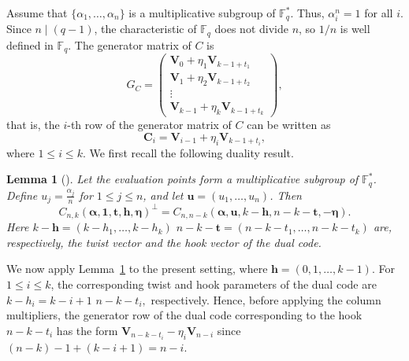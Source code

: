 \documentclass[12pt,draftcls,journal,onecolumn]{IEEEtran}
\newtheorem{lemma}[theorem]{Lemma}
\newcommand{\F}{{\mathbb{F}}}
\begin{document}
Assume that $\{\alpha_1,\ldots,\alpha_n\}$ is a multiplicative subgroup of $\F_q^*$. Thus,
$
\alpha_i^n=1
$
for all $i$. Since $n\mid(q-1)$, the characteristic of $\F_q$ does not divide $n$, so $1/n$ is well defined in $\F_q$.
The generator matrix of $C$ is
\begin{equation*}
G_C=
\begin{pmatrix}
\mathbf{V}_0+\eta_1\mathbf{V}_{k-1+t_1}\\
\mathbf{V}_1+\eta_2\mathbf{V}_{k-1+t_2}\\
\vdots\\
\mathbf{V}_{k-1}+\eta_k\mathbf{V}_{k-1+t_k}
\end{pmatrix},
\end{equation*}
that is, the $i$-th row of the generator matrix of $C$
can be written as
\begin{equation}\label{eq:CiLCD}
\mathbf{C}_i
=
\mathbf{V}_{i-1}+\eta_i\mathbf{V}_{k-1+t_i},
\end{equation}
where \(1\le i\le k\). We first recall the following duality result.

\begin{lemma}[{\cite[Theorem~2]{BeelenEtAl2018}}]\label{lem:dual}
Let the evaluation points form a multiplicative subgroup of
\(\mathbb{F}_q^*\). Define \(u_j=\frac{\alpha_j}{n}\) for \(1\le j\le n\),
and let
\(\mathbf u=(u_1,\ldots,u_n)\).
Then
\[
C_{n,k}(\boldsymbol{\alpha},\mathbf 1,
\boldsymbol t,\boldsymbol h,\boldsymbol\eta)^\perp
=
C_{n,n-k}(\boldsymbol{\alpha},\mathbf u,
k-\boldsymbol h,n-k-\boldsymbol t,
-\boldsymbol\eta).
\]
Here
\(
k-\boldsymbol h=(k-h_1,\ldots,k-h_k)
\)
\(
n-k-\boldsymbol t=(n-k-t_1,\ldots,n-k-t_k)
\)
are, respectively, the twist vector and the hook vector of the dual
code.
\end{lemma}

We now apply Lemma~\ref{lem:dual} to the present setting, where
\(
\mathbf h=(0,1,\ldots,k-1).
\)
For \(1\le i\le k\), the corresponding twist and hook parameters of the
dual code are
\(
k-h_i=k-i+1
\)
\(
n-k-t_i,
\)
respectively. Hence, before applying the column multipliers, the
generator row of the dual code corresponding to the hook
\(n-k-t_i\) has the form
$
\mathbf{V}_{n-k-t_i}-\eta_i\mathbf{V}_{n-i}
$
since
\(
(n-k)-1+(k-i+1)=n-i.
\)
\end{document}

